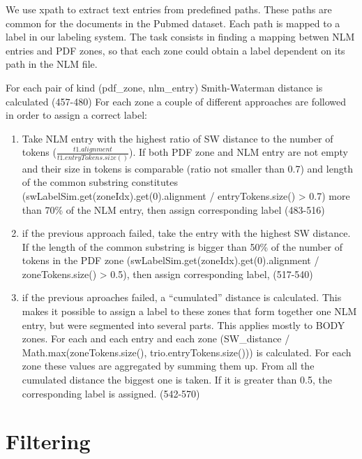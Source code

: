 We use xpath to extract text entries from predefined paths. These paths are common for the documents in the Pubmed dataset. Each path is mapped to a label in our labeling system. The task consists in finding a mapping betwen NLM entries and PDF zones, so that each zone could obtain a label dependent on its path in the NLM file.

For each pair of kind (pdf\_zone, nlm\_entry) Smith-Waterman distance
is calculated (457-480) For each zone a couple of different approaches are followed in order to assign a correct label:
\begin{enumerate}
\item Take NLM entry with the highest ratio of SW distance to the number of tokens ($\frac{t1.alignment}{t1.entryTokens.size()}$). If both PDF zone and NLM entry are not empty and their size in tokens is comparable (ratio not smaller than 0.7) and length of the common substring constitutes (swLabelSim.get(zoneIdx).get(0).alignment / entryTokens.size() > 0.7) more than 70\% of the NLM entry, then assign corresponding label (483-516)
\item if the previous approach failed, take the entry with the highest SW distance. If the length of the common substring is bigger than 50\% of the number of tokens in the PDF zone (swLabelSim.get(zoneIdx).get(0).alignment / zoneTokens.size() > 0.5), then assign corresponding label, (517-540)
\item if the previous aproaches failed, a ``cumulated'' distance is calculated. This makes it possible to assign a label to these zones that form together one NLM entry, but were segmented into several parts. This applies mostly to BODY zones. For each and each entry and each zone (SW\_distance / Math.max(zoneTokens.size(), trio.entryTokens.size())) is calculated. For each zone these values are aggregated by summing them up. From all the cumulated distance the biggest one is taken. If it is greater than 0.5, the corresponding label is assigned. (542-570)
\end{enumerate}
\section{Filtering}
